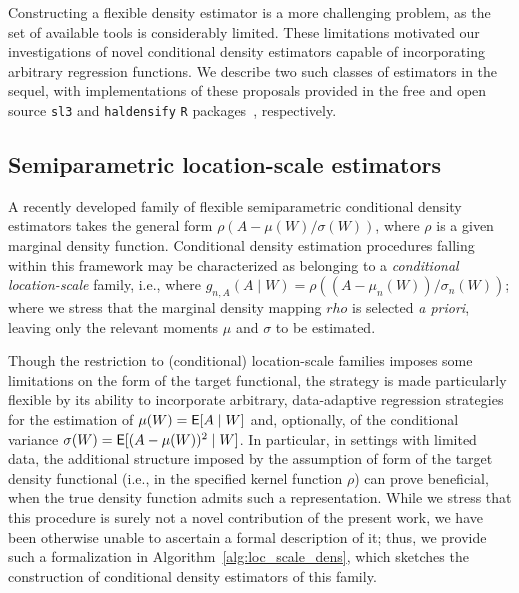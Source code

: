 Constructing a flexible density estimator is a more challenging problem, as the
set of available tools is considerably limited. These limitations motivated our
investigations of novel conditional density estimators capable of incorporating
arbitrary regression functions. We describe two such classes of estimators in
the sequel, with implementations of these proposals provided in the free and
open source \texttt{sl3} and \texttt{haldensify} \texttt{R}
packages~\citep{coyle2021sl3, hejazi2021haldensify}, respectively.

\subsection{Semiparametric location-scale estimators}\label{hose_hese_est}

A recently developed family of flexible semiparametric conditional density
estimators takes the general form $\rho(A - \mu(W) / \sigma(W))$, where $\rho$
is a given marginal density function. Conditional density estimation procedures
falling within this framework may be characterized as belonging to
a \textit{conditional location-scale} family, i.e., where $g_{n,A}(A \mid W)
= \rho((A - \mu_n(W)) / \sigma_n(W))$; where we stress that the marginal density
mapping $rho$ is selected \textit{a priori}, leaving only the relevant moments
$\mu$ and $\sigma$ to be estimated.

Though the restriction to (conditional) location-scale families imposes some
limitations on the form of the target functional, the strategy is made
particularly flexible by its ability to incorporate arbitrary, data-adaptive
regression strategies for the estimation of $\mu(W) = \mathsf{E}[A \mid W]$ and,
optionally, of the conditional variance $\sigma(W) = \mathsf{E}[(A - \mu(W))^2 \mid W]$.
In particular, in settings with limited data, the additional structure imposed
by the assumption of form of the target density functional (i.e., in the
specified kernel function $\rho$) can prove beneficial, when the true density
function admits such a representation. While we stress that this procedure is
surely not a novel contribution of the present work, we have been otherwise
unable to ascertain a formal description of it; thus, we provide such
a formalization in Algorithm~\ref{alg:loc_scale_dens}, which sketches the
construction of conditional density estimators of this family.

